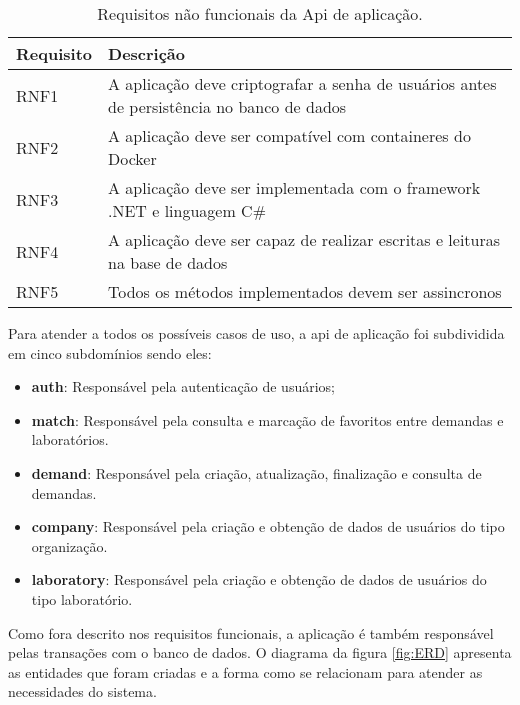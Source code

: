 \begin{table}[H]
  \caption{Requisitos não funcionais da Api de aplicação.}
  \label{tab:requisitos_nao_funcionais_api}
  \begin{tabularx}{\textwidth}{l|l}
    \hline
    \textbf{Requisito} & \textbf{Descrição}                                                                        \\ \hline
    RNF1               & A aplicação deve criptografar a senha de usuários antes de persistência no banco de dados \\
    RNF2               & A aplicação deve ser compatível com containeres do Docker                                 \\
    RNF3               & A aplicação deve ser implementada com o framework .NET e linguagem C{\#}                  \\
    RNF4               & A aplicação deve ser capaz de realizar escritas e leituras na base de dados               \\
    RNF5               & Todos os métodos implementados devem ser assincronos                                      \\ \hline
  \end{tabularx}
  \fonte{}
\end{table}

Para atender a todos os possíveis casos de uso, a \gls{api} de aplicação foi subdividida em cinco subdomínios sendo eles:

\begin{itemize}
  \item \textbf{auth}: Responsável pela autenticação de usuários;
  \item \textbf{match}: Responsável pela consulta e marcação de favoritos entre demandas e laboratórios.
  \item \textbf{demand}: Responsável pela criação, atualização, finalização e consulta de demandas.
  \item \textbf{company}: Responsável pela criação e obtenção de dados de usuários do tipo organização.
  \item \textbf{laboratory}: Responsável pela criação e obtenção de dados de usuários do tipo laboratório.
\end{itemize}

Como fora descrito nos requisitos funcionais, a aplicação é também responsável pelas transações com o banco de dados. O diagrama da figura \ref{fig:ERD} apresenta as entidades que foram criadas e a forma como se relacionam para atender as necessidades do sistema.

